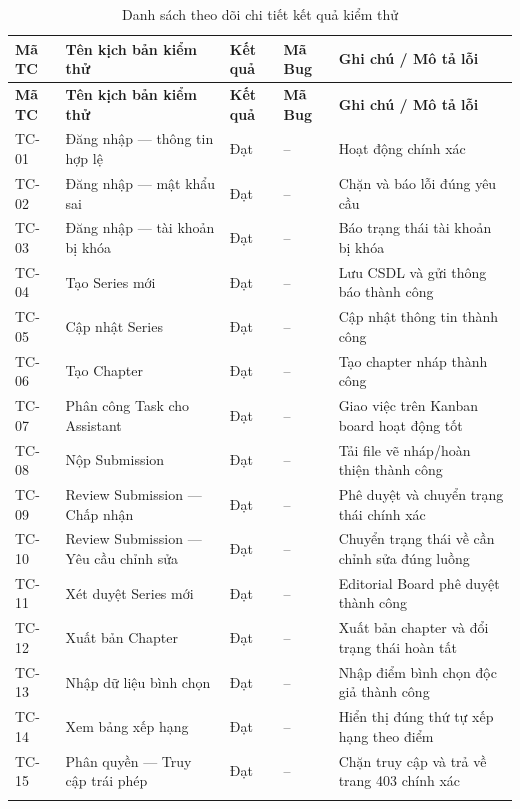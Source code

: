 \renewcommand{\arraystretch}{1.3}
\begin{longtable}{|>{\centering\arraybackslash}p{1.2cm}|>{\raggedright\arraybackslash}p{6.0cm}|>{\centering\arraybackslash}p{1.5cm}|>{\centering\arraybackslash}p{1.5cm}|>{\raggedright\arraybackslash}p{4.5cm}|}
\hline
\rowcolor{tableheader}
\textbf{Mã TC} & \textbf{Tên kịch bản kiểm thử} & \textbf{Kết quả} & \textbf{Mã Bug} & \textbf{Ghi chú / Mô tả lỗi} \\ \hline
\endfirsthead
\hline
\rowcolor{tableheader}
\textbf{Mã TC} & \textbf{Tên kịch bản kiểm thử} & \textbf{Kết quả} & \textbf{Mã Bug} & \textbf{Ghi chú / Mô tả lỗi} \\ \hline
\endhead
TC-01 & Đăng nhập — thông tin hợp lệ & Đạt & -- & Hoạt động chính xác \\ \hline
TC-02 & Đăng nhập — mật khẩu sai & Đạt & -- & Chặn và báo lỗi đúng yêu cầu \\ \hline
TC-03 & Đăng nhập — tài khoản bị khóa & Đạt & -- & Báo trạng thái tài khoản bị khóa \\ \hline
TC-04 & Tạo Series mới & Đạt & -- & Lưu CSDL và gửi thông báo thành công \\ \hline
TC-05 & Cập nhật Series & Đạt & -- & Cập nhật thông tin thành công \\ \hline
TC-06 & Tạo Chapter & Đạt & -- & Tạo chapter nháp thành công \\ \hline
TC-07 & Phân công Task cho Assistant & Đạt & -- & Giao việc trên Kanban board hoạt động tốt \\ \hline
TC-08 & Nộp Submission & Đạt & -- & Tải file vẽ nháp/hoàn thiện thành công \\ \hline
TC-09 & Review Submission — Chấp nhận & Đạt & -- & Phê duyệt và chuyển trạng thái chính xác \\ \hline
TC-10 & Review Submission — Yêu cầu chỉnh sửa & Đạt & -- & Chuyển trạng thái về cần chỉnh sửa đúng luồng \\ \hline
TC-11 & Xét duyệt Series mới & Đạt & -- & Editorial Board phê duyệt thành công \\ \hline
TC-12 & Xuất bản Chapter & Đạt & -- & Xuất bản chapter và đổi trạng thái hoàn tất \\ \hline
TC-13 & Nhập dữ liệu bình chọn & Đạt & -- & Nhập điểm bình chọn độc giả thành công \\ \hline
TC-14 & Xem bảng xếp hạng & Đạt & -- & Hiển thị đúng thứ tự xếp hạng theo điểm \\ \hline
TC-15 & Phân quyền — Truy cập trái phép & Đạt & -- & Chặn truy cập và trả về trang 403 chính xác \\ \hline
\caption{Danh sách theo dõi chi tiết kết quả kiểm thử}
\label{tab:test_details}
\end{longtable}
